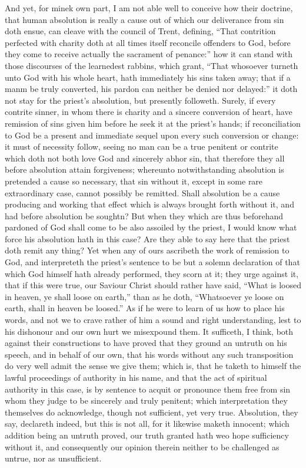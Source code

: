 And yet, for minek own part, I am not able well to conceive how their doctrine, that human absolution is really a cause out of which our deliverance from sin doth ensue, can cleave with the council of Trent, defining, “That contrition perfected with charity doth at all times itself reconcile offenders to God, before they come to receive actually the sacrament of penance:” how it can stand with those discourses of the learnedest rabbins, which grant, “That whosoever turneth unto God with his whole heart, hath immediately his sins taken away; that if a manm be truly converted, his pardon can neither be denied nor delayed:” it doth not stay for the priest’s absolution, but presently followeth. Surely, if every contrite sinner, in whom there is charity and a sincere conversion of heart, have remission of sins given him before he seek it at the priest’s hands; if reconciliation to God be a present and immediate sequel upon every such conversion or change: it must of necessity follow, seeing no man can be a true penitent or contrite which doth not both love God and sincerely abhor sin, that therefore they all before absolution attain forgiveness; whereunto notwithstanding absolution is pretended a cause so necessary, that sin without it, except in some rare extraordinary case, cannot possibly be remitted. Shall absolution be a cause producing and working that effect which is always brought forth without it, and had before absolution be soughtn? But when they which are thus beforehand pardoned of God shall come to be also assoiled by the  priest, I would know what force his absolution hath in this case? Are they able to say here that the priest doth remit any thing? Yet when any of ours ascribeth the work of remission to God, and interpreteth the priest’s sentence to be but a solemn declaration of that which God himself hath already performed, they scorn at it; they urge against it, that if this were true, our Saviour Christ should rather have said, “What is loosed in heaven, ye shall loose on earth,” than as he doth, “Whatsoever ye loose on earth, shall in heaven be loosed.” As if he were to learn of us how to place his words, and not we to crave rather of him a sound and right understanding, lest to his dishonour and our own hurt we misexpound them. It sufficeth, I think, both against their constructions to have proved that they ground an untruth on his speech, and in behalf of our own, that his words without any such transposition do very well admit the sense we give them; which is, that he taketh to himself the lawful proceedings of authority in his name, and that the act of spiritual authority in this case, is by sentence to acquit or pronounce them free from sin whom they judge to be sincerely and truly penitent; which interpretation they themselves do acknowledge, though not sufficient, yet very true. Absolution, they say, declareth indeed, but this is not all, for it likewise maketh innocent; which addition being an untruth proved, our truth granted hath weo hope sufficiency without it, and consequently our opinion therein neither to be challenged as untrue, nor as unsufficient.

